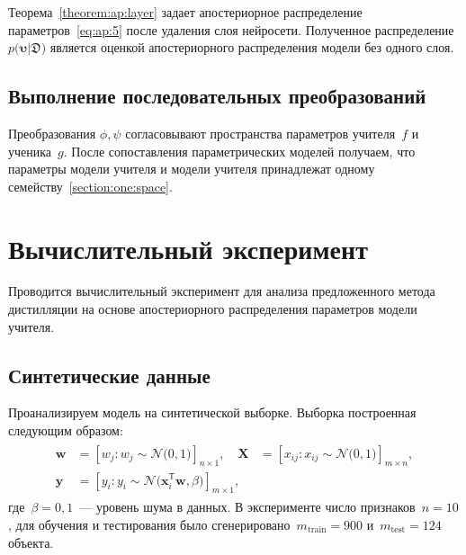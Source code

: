 \documentclass[12pt]{a&t}
\begin{document}
Теорема~\ref{theorem:ap:layer} задает апостериорное распределение параметров~\eqref{eq:ap:5} после удаления слоя нейросети. Полученное распределение $p\bigr(\bm{\upsilon}|\mathfrak{D}\bigr) $ является оценкой апостериорного распределения модели без одного слоя.

\subsection{Выполнение последовательных преобразований}
Преобразования $\phi, \psi$ согласовывают пространства параметров учителя~$f$ и ученика~$g$. После сопоставления параметрических моделей получаем, что параметры модели учителя и модели учителя принадлежат одному семейству~\ref{section:one:space}.

\section{Вычислительный эксперимент}
Проводится вычислительный эксперимент для анализа предложенного метода дистилляции на основе апостериорного распределения параметров модели учителя.

\subsection{Синтетические данные}
Проанализируем модель на синтетической выборке. Выборка построенная следующим образом:
\begin{gather}
\label{eq:ex:1}
\begin{aligned}
\mathbf{w} &= \left[w_j: w_{j}\sim \mathcal{N}\bigr(0, 1\bigr)\right]_{n\times 1}, \quad \mathbf{X} &= \left[x_{ij}: x_{ij}\sim\mathcal{N}\bigr(0, 1\bigr)\right]_{m\times n}, \\
 \mathbf{y} &= \left[y_i: y_i \sim \mathcal{N}\bigr(\mathbf{x}_i^{\mathsf{T}}\mathbf{w}, \beta\bigr)\right]_{m \times 1},
\end{aligned}
\end{gather} 
где~$\beta=0{,}1$~--- уровень шума в данных. В эксперименте число признаков~$n=10$, для обучения и тестирования было сгенерировано~$m_{\text{train}}=900$ и~$m_{\text{test}}=124$ объекта.
\end{document}
